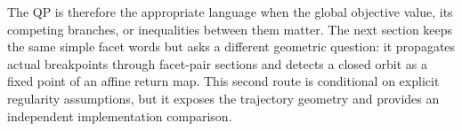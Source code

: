 The QP is therefore the appropriate language when the global objective value,
its competing branches, or inequalities between them matter.  The next
section keeps the same simple facet words but asks a different geometric
question: it propagates actual breakpoints through facet-pair sections and
detects a closed orbit as a fixed point of an affine return map.  This second
route is conditional on explicit regularity assumptions, but it exposes the
trajectory geometry and provides an independent implementation comparison.
